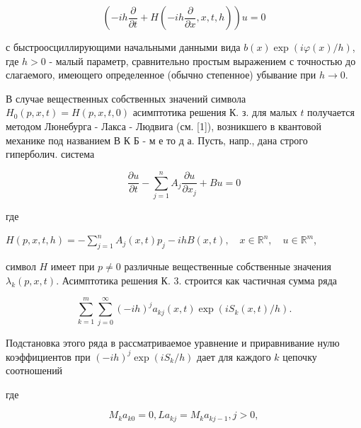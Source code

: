 \documentclass[10pt]{article}
\begin{document}
\[

\left(-i h \frac{\partial}{\partial t}+H\left(-i h \frac{\partial}{\partial x}, x, t, h\right)\right) u=0

\]



с быстроосциллирующими начальными данными вида $b(x) \exp (i \varphi(x) / h)$, где $h>0$ - малый параметр, сравнительно простым выражением с точностью до слагаемого, имеющего определенное (обычно степенное) убывание при $h \rightarrow 0$.



В случае вещественных собственных значений символа $H_{0}(p, x, t)=H(p, x, t, 0)$ асимптотика решения К. з. для малых $t$ получается методом Люнебурга - Лакса - Людвига (см. [1]), возникшего в квантовой механике под названием В К Б - м е то д а. Пусть, напр., дана строго гиперболич. система



\[

\frac{\partial u}{\partial t}-\sum_{j=1}^{n} A_{j} \frac{\partial u}{\partial x_{j}}+B u=0

\]



где



$H(p, x, t, h)=-\sum_{j=1}^{n} A_{j}(x, t) p_{j}-i h B(x, t), \quad x \in \mathbb{R}^{n}, \quad u \in \mathbb{R}^{m}$,



символ $H$ имеет при $p \neq 0$ различные вещественные собственные значения $\lambda_{k}(p, x, t)$. Асимптотика решения К. 3. строится как частичная сумма ряда



\[

\sum_{k=1}^{m} \sum_{j=0}^{\infty}(-i h)^{j} a_{k j}(x, t) \exp \left(i S_{k}(x, t) / h\right) .

\]



Подстановка этого ряда в рассматриваемое уравнение и приравнивание нулю коэффициентов при $(-i h)^{j} \exp \left(i S_{k} / h\right)$ дает для каждого $k$ цепочку соотношений



где



\[

M_{k} a_{k 0}=0, L a_{k j}=M_{k} a_{k j-1}, j>0,

\]
\end{document}
